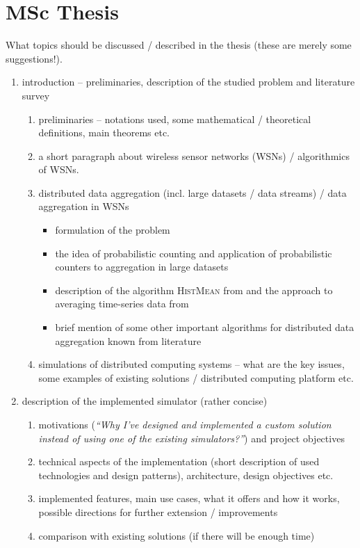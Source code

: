 \documentclass[a4paper, 12pt]{article}
\begin{document}
\section*{MSc Thesis}
What topics should be discussed / described in the thesis (these are merely some suggestions!).
\begin{enumerate}[label*=\arabic*.]
	\item introduction -- preliminaries, description of the studied problem and literature survey
		\begin{enumerate}[label*=\arabic*.]
			\item preliminaries -- notations used, some mathematical / theoretical definitions, main theorems etc.
			\item a short paragraph about wireless sensor networks (WSNs) / algorithmics of WSNs.
			\item distributed data aggregation (incl. large datasets / data streams) / data aggregation in WSNs
					\begin{itemize}
						\item formulation of the problem
						\item the idea of probabilistic counting and application of probabilistic counters to aggregation in large datasets
						\item description of the algorithm \textsc{HistMean} from \cite{JCi:2018:Histograms} and the approach
							  to averaging time-series data from \cite{Nugroho:2020:AveragingTS}
						\item brief mention of some other important algorithms for distributed data aggregation known from literature
					\end{itemize}
			\item simulations of distributed computing systems -- what are the key issues, some examples of existing solutions / distributed computing platform etc. 
		\end{enumerate}
	
	\item description of the implemented simulator (rather concise)
		\begin{enumerate}[label*=\arabic*.]
			\item motivations (\emph{``Why I've designed and implemented a custom solution instead of using one of the existing simulators?''}) and project objectives
			\item technical aspects of the implementation (short description of used technologies and design patterns), architecture, design objectives etc. 
			\item implemented features, main use cases, what it offers and how it works, possible directions for further extension / improvements
			\item comparison with existing solutions (if there will be enough time)
		\end{enumerate}
	

\end{enumerate}
\end{document}
